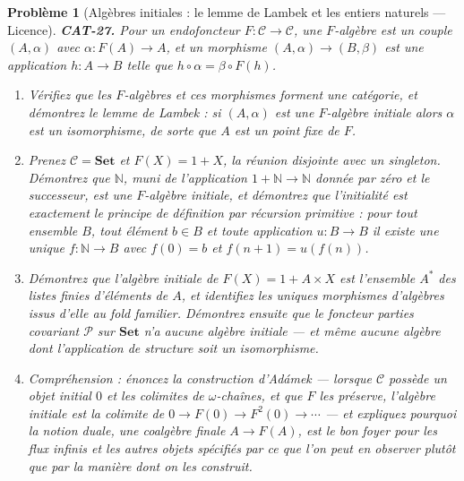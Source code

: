 \documentclass[11pt]{article}
\newtheorem{problem}{Problème}
\begin{document}
\begin{problem}[{Algèbres initiales : le lemme de Lambek et les entiers naturels --- Licence}]
\textbf{CAT-27.} Pour un endofoncteur $ F \colon \mathcal{C} \to \mathcal{C} $, une
\textit{$ F $-algèbre} est un couple $ (A, \alpha) $ avec $ \alpha \colon F(A) \to A $, et
un morphisme $ (A, \alpha) \to (B, \beta) $ est une application $ h \colon A \to B $ telle que
$ h \circ \alpha = \beta \circ F(h) $.
\begin{enumerate}
\item[(a)] Vérifiez que les $ F $-algèbres et ces morphismes forment une catégorie, et démontrez le
\textit{lemme de Lambek} : si $ (A, \alpha) $ est une $ F $-algèbre initiale alors $ \alpha $
est un isomorphisme, de sorte que $ A $ est un point fixe de $ F $.
\item[(b)] Prenez $ \mathcal{C} = \mathbf{Set} $ et $ F(X) = 1 + X $, la réunion disjointe avec un
singleton. Démontrez que $ \mathbb{N} $, muni de l'application $ 1 + \mathbb{N} \to \mathbb{N} $
donnée par zéro et le successeur, est une $ F $-algèbre initiale, et démontrez que l'initialité
est exactement le principe de définition par récursion primitive : pour tout ensemble $ B $,
tout élément $ b \in B $ et toute application $ u \colon B \to B $ il existe une unique
$ f \colon \mathbb{N} \to B $ avec $ f(0) = b $ et $ f(n+1) = u(f(n)) $.
\item[(c)] Démontrez que l'algèbre initiale de $ F(X) = 1 + A \times X $ est l'ensemble $ A^{*} $ des
listes finies d'éléments de $ A $, et identifiez les uniques morphismes d'algèbres issus d'elle
au fold familier. Démontrez ensuite que le foncteur parties covariant $ \mathcal{P} $ sur
$ \mathbf{Set} $ n'a aucune algèbre initiale --- et même aucune algèbre dont l'application de
structure soit un isomorphisme.
\item[(d)] Compréhension : énoncez la construction d'Adámek --- lorsque $ \mathcal{C} $ possède un objet
initial $ 0 $ et les colimites de $ \omega $-chaînes, et que $ F $ les préserve, l'algèbre
initiale est la colimite de $ 0 \to F(0) \to F^2(0) \to \cdots $ --- et expliquez pourquoi la
notion duale, une \textit{coalgèbre} finale $ A \to F(A) $, est le bon foyer pour les flux infinis
et les autres objets spécifiés par ce que l'on peut en observer plutôt que par la manière dont on
les construit.
\end{enumerate}

\end{problem}
\end{document}
